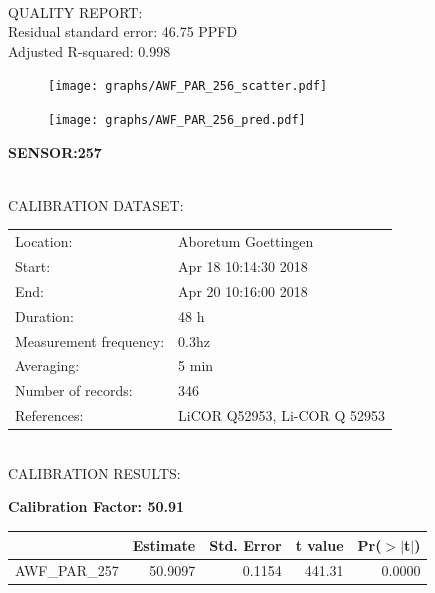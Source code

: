 \documentclass[oneside]{report}
\begin{document}
\hrulefill\\
QUALITY REPORT:\\
Residual standard error: 46.75 PPFD\\
Adjusted R-squared: 0.998



\begin{figure}[H]
  \centering
  \texttt{[image: graphs/AWF\_PAR\_256\_scatter.pdf]}
\end{figure}




\begin{figure}[H]
  \centering
  \texttt{[image: graphs/AWF\_PAR\_256\_pred.pdf]}
\end{figure}

\pagebreak


\begin{center}
\large{\textbf{SENSOR:257}}\\
\end{center}

\hrulefill\\
CALIBRATION DATASET:\\
\begin{table}[h!]
  \centering
  \label{tab:table1}
  \begin{tabular}{ll}
    Location: & Aboretum Goettingen\\ 
    
    
    Start:  & Apr 18 10:14:30 2018 \\
    End:   & Apr 20 10:16:00 2018\\ 
    Duration: & 48 h\\
    Measurement frequency: & 0.3hz\\
    Averaging:  &5 min\\
    Number of records: & 346 \\
    References: & LiCOR Q52953, Li-COR Q 52953 \\
  \end{tabular}
\end{table}

\hrulefill\\
CALIBRATION RESULTS:\\


\begin{center}
\textbf{\large{Calibration Factor: 50.91}}\\
\end{center}
\begin{table}[ht]
\centering
\begin{tabular}{rrrrr}
  \hline
 & Estimate & Std. Error & t value & Pr($>$$|$t$|$) \\ 
  \hline
AWF\_PAR\_257 & 50.9097 & 0.1154 & 441.31 & 0.0000 \\ 
   \hline
\end{tabular}
\end{table}
\end{document}
